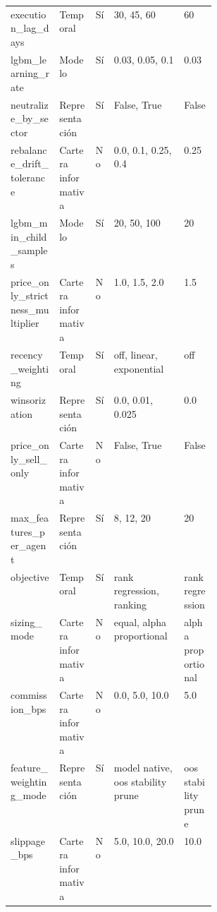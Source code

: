 \begin{longtable}{lllp{0.34\linewidth}l}
execution\_lag\_days & Temporal & Sí & 30, 45, 60 & 60 \\
lgbm\_learning\_rate & Modelo & Sí & 0.03, 0.05, 0.1 & 0.03 \\
neutralize\_by\_sector & Representación & Sí & False, True & False \\
rebalance\_drift\_tolerance & Cartera informativa & No & 0.0, 0.1, 0.25, 0.4 & 0.25 \\
lgbm\_min\_child\_samples & Modelo & Sí & 20, 50, 100 & 20 \\
price\_only\_strictness\_multiplier & Cartera informativa & No & 1.0, 1.5, 2.0 & 1.5 \\
recency\_weighting & Temporal & Sí & off, linear, exponential & off \\
winsorization & Representación & Sí & 0.0, 0.01, 0.025 & 0.0 \\
price\_only\_sell\_only & Cartera informativa & No & False, True & False \\
max\_features\_per\_agent & Representación & Sí & 8, 12, 20 & 20 \\
objective & Temporal & Sí & rank regression, ranking & rank regression \\
sizing\_mode & Cartera informativa & No & equal, alpha proportional & alpha proportional \\
commission\_bps & Cartera informativa & No & 0.0, 5.0, 10.0 & 5.0 \\
feature\_weighting\_mode & Representación & Sí & model native, oos stability prune & oos stability prune \\
slippage\_bps & Cartera informativa & No & 5.0, 10.0, 20.0 & 10.0 \\
\end{longtable}
